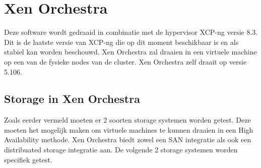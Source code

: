 



\section{Xen Orchestra}%
Deze software wordt gedraaid in combinatie met de hypervisor XCP-ng versie 8.3. Dit is de laatste versie van XCP-ng die op dit moment beschikbaar is en als stabiel kan worden beschouwd.
Xen Orchestra zal draaien in een virtuele machine op een van de fysieke nodes van de cluster. Xen Orchestra zelf draait op versie 5.106.

\subsection{Storage in Xen Orchestra}%
Zoals eerder vermeld moeten er 2 soorten storage systemen worden getest. Deze moeten het mogelijk maken om virtuele machines te kunnen draaien in een High Availability methode.
Xen Orchestra biedt zowel een SAN integratie als ook een distribuated storage integratie aan.
De volgende 2 storage systemen worden specifiek getest.


